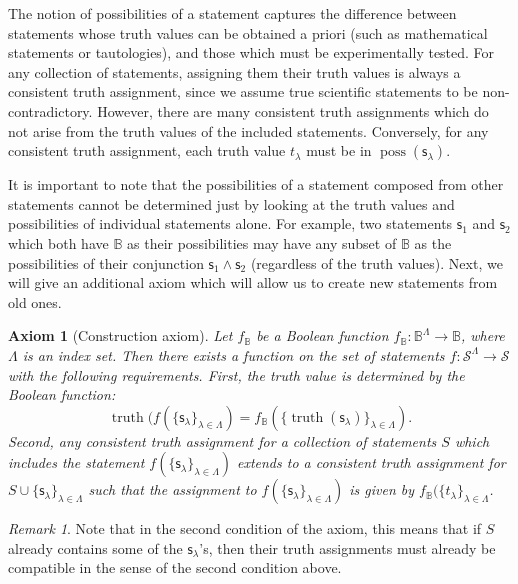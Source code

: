 \documentclass[psamsfonts]{amsart}
\newtheorem{axiom}[thm]{Axiom}
\theoremstyle{definition}
\theoremstyle{remark}
\newtheorem{rem}[thm]{Remark}
\numberwithin{equation}{section}
\DeclareMathOperator{\truth}{truth}
\DeclareMathOperator{\possFn}{poss}
\def\AND{\wedge}
\newcommand{\stmt}[1][s] {\mathsf{#1}}
\begin{document}
The notion of possibilities of a statement captures the difference between statements whose truth values can be obtained a priori (such as mathematical statements or tautologies), and those which must be experimentally tested. For any collection of statements, assigning them their truth values is always a consistent truth assignment, since we assume true scientific statements to be non-contradictory. However, there are many consistent truth assignments which do not arise from the truth values of the included statements. Conversely, for any consistent truth assignment, each truth value $t_{\lambda}$ must be in $\possFn(\stmt_{\lambda})$. 

It is important to note that the possibilities of a statement composed from other statements cannot be determined just by looking at the truth values and possibilities of individual statements alone. For example, two statements $\stmt_1$ and $\stmt_2$ which both have $\mathbb{B}$ as their possibilities may have any subset of $\mathbb{B}$ as the possibilities of their conjunction $\stmt_1\AND\stmt_2$ (regardless of the truth values). Next, we will give an additional axiom which will allow us to create new statements from old ones. 

\begin{axiom}[Construction axiom]
Let $f_{\mathbb{B}}$ be a Boolean function $f_{\mathbb{B}}:\mathbb{B}^{\Lambda}\to\mathbb{B}$, where $\Lambda$ is an index set. Then there exists a function on the set of statements $f:\mathcal{S}^{\Lambda}\to\mathcal{S}$ with the following requirements. First, the truth value is determined by the Boolean function:
\begin{equation}
\label{constructionrequirement}
\truth(f(\{\stmt_{\lambda}\}_{\lambda\in\Lambda}) = f_{\mathbb{B}}(\{\truth(\stmt_{\lambda})\}_{\lambda\in\Lambda}).
\end{equation}
Second, any consistent truth assignment for a collection of statements $S$ which includes the statement $f(\{\stmt_{\lambda}\}_{\lambda\in\Lambda})$ extends to a consistent truth assignment for $S\cup\{\stmt_{\lambda}\}_{\lambda\in\Lambda}$ such that the assignment to $f(\{\stmt_{\lambda}\}_{\lambda\in\Lambda})$ is given by $f_{\mathbb{B}}(\{t_{\lambda}\}_{\lambda\in\Lambda}$. 
\end{axiom}

\begin{rem}
Note that in the second condition of the axiom, this means that if $S$ already contains some of the $\stmt_{\lambda}$'s, then their truth assignments must already be compatible in the sense of the second condition above. 
\end{rem}
\end{document}
